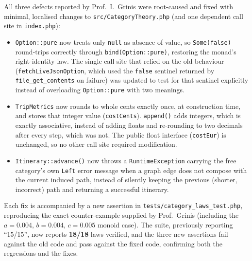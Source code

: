 All three defects reported by Prof.~I.~Grinis were root-caused and fixed with minimal, localised changes to \texttt{src/CategoryTheory.php} (and one dependent call site in \texttt{index.php}):

\begin{itemize}
  \item \texttt{Option::pure} now treats only \texttt{null} as absence of value, so \texttt{Some(false)} round-trips correctly through \texttt{bind(Option::pure)}, restoring the monad's right-identity law. The single call site that relied on the old behaviour (\texttt{fetchLiveJsonOption}, which used the \texttt{false} sentinel returned by \texttt{file\_get\_contents} on failure) was updated to test for that sentinel explicitly instead of overloading \texttt{Option::pure} with two meanings.
  \item \texttt{TripMetrics} now rounds to whole cents exactly once, at construction time, and stores that integer value (\texttt{costCents}). \texttt{append()} adds integers, which is exactly associative, instead of adding floats and re-rounding to two decimals after every step, which was not. The public float interface (\texttt{costEur}) is unchanged, so no other call site required modification.
  \item \texttt{Itinerary::advance()} now throws a \texttt{RuntimeException} carrying the free category's own \texttt{Left} error message when a graph edge does not compose with the current induced path, instead of silently keeping the previous (shorter, incorrect) path and returning a successful itinerary.
\end{itemize}

Each fix is accompanied by a new assertion in \texttt{tests/category\_laws\_test.php}, reproducing the exact counter-example supplied by Prof.~Grinis (including the $a=0.004,\,b=0.004,\,c=0.005$ monoid case). The suite, previously reporting ``15/15'', now reports \textbf{18/18} laws verified, and the three new assertions fail against the old code and pass against the fixed code, confirming both the regressions and the fixes.
